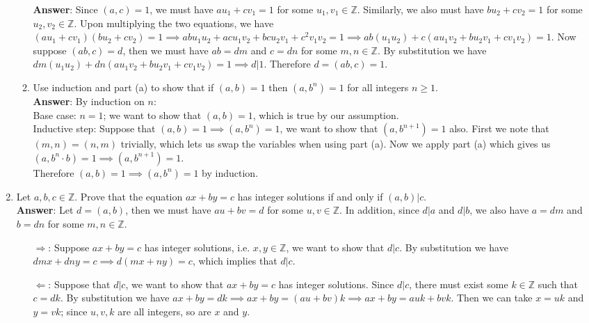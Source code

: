 \documentclass{article}
\begin{document}
\begin{enumerate}
\begin{enumerate}
                        \textbf{Answer}: Since $(a,c)=1$, we must have $au_1+cv_1=1$ for some $u_1,v_1\in\mathbb{Z}$. Similarly, we also must have $bu_2+cv_2=1$ for some $u_2,v_2\in\mathbb{Z}$. Upon multiplying the two equations, we have $(au_1+cv_1)(bu_2+cv_2)=1\implies abu_1u_2+acu_1v_2+bcu_2v_1+c^2v_1v_2=1\implies ab(u_1u_2)+c(au_1v_2+bu_2v_1+cv_1v_2)=1$. Now suppose $(ab,c)=d$, then we must have $ab=dm$ and $c=dn$ for some $m,n\in\mathbb{Z}$. By substitution we have $dm(u_1u_2)+dn(au_1v_2+bu_2v_1+cv_1v_2)=1\implies d|1$. Therefore $d=(ab,c)=1$.
                  \item Use induction and part (a) to show that if $(a,b)=1$ then $(a,b^n)=1$ for all integers $n\geq 1$.\\
                        \textbf{Answer}: By induction on $n$:\\
                        Base case: $n=1$; we want to show that $(a,b)=1$, which is true by our assumption.\\
                        Inductive step: Suppose that $(a,b)=1\implies (a,b^n)=1$, we want to show that $(a,b^{n+1})=1$ also. First we note that $(m,n)=(n,m)$ trivially, which lets us swap the variables when using part (a). Now we apply part (a) which gives us $(a,b^n\cdot b)=1\implies (a,b^{n+1})=1$.\\
                        Therefore $(a,b)=1\implies (a,b^n)=1$ by induction.
            \end{enumerate}
      \item Let $a,b,c\in\mathbb{Z}$. Prove that the equation $ax+by=c$ has integer solutions if and only if $(a,b)|c$.\\
            \textbf{Answer}: Let $d=(a,b)$, then we must have $au+bv=d$ for some $u,v\in\mathbb{Z}$. In addition, since $d|a$ and $d|b$, we also have $a=dm$ and $b=dn$ for some $m,n\in\mathbb{Z}$.
            \begin{itemize}
                  \item [$\Rightarrow$:] Suppose $ax+by=c$ has integer solutions, i.e. $x,y\in\mathbb{Z}$, we want to show that $d|c$. By substitution we have $dmx+dny=c\implies d(mx+ny)=c$, which implies that $d|c$.
                  \item [$\Leftarrow$:] Suppose that $d|c$, we want to show that $ax+by=c$ has integer solutions. Since $d|c$, there must exist some $k\in\mathbb{Z}$ such that $c=dk$. By substitution we have $ax+by=dk\implies ax+by=(au+bv)k\implies ax+by=auk+bvk$. Then we can take $x=uk$ and $y=vk$; since $u,v,k$ are all integers, so are $x$ and $y$.

\end{itemize}
\end{enumerate}
\end{document}
